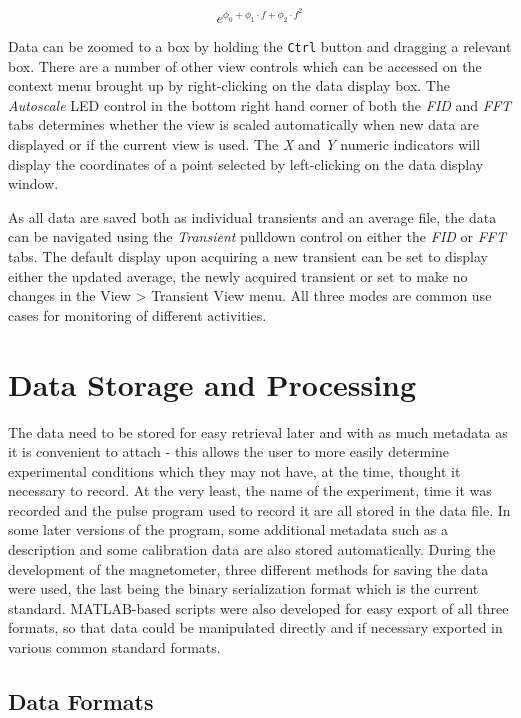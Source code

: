 \documentclass[PaulGanssle-Thesis.tex]{subfiles}
\begin{document}
\begin{equation}
e^{\phi_{0} + \phi_{1}\cdot{}f + \phi_{2}\cdot{}f^{2}}
\label{eqn:DisplayPhaseCorrection}
\end{equation}

Data can be zoomed to a box by holding the \lstinline|Ctrl| button and dragging a relevant box. There are a number of other view controls which can be accessed on the context menu brought up by right-clicking on the data display box. The \textit{Autoscale} LED control in the bottom right hand corner of both the \textit{FID} and \textit{FFT} tabs determines whether the view is scaled automatically when new data are displayed or if the current view is used. The \textit{X} and \textit{Y} numeric indicators will display the coordinates of a point selected by left-clicking on the data display window.

As all data are saved both as individual transients and an average file, the data can be navigated using the \textit{Transient} pulldown control on either the \textit{FID} or \textit{FFT} tabs. The default display upon acquiring a new transient can be set to display either the updated average, the newly acquired transient or set to make no changes in the View > Transient View menu. All three modes are common use cases for monitoring of different activities.

\section{Data Storage and Processing}
\label{console.software.data}
The data need to be stored for easy retrieval later and with as much metadata as it is convenient to attach - this allows the user to more easily determine experimental conditions which they may not have, at the time, thought it necessary to record. At the very least, the name of the experiment, time it was recorded and the pulse program used to record it are all stored in the data file. In some later versions of the program, some additional metadata such as a description and some calibration data are also stored automatically. During the development of the magnetometer, three different methods for saving the data were used, the last being the binary serialization format which is the current standard. MATLAB-based scripts were also developed for easy export of all three formats, so that data could be manipulated directly and if necessary exported in various common standard formats.

\subsection{Data Formats}
\label{console.software.data.legacy}
\end{document}
